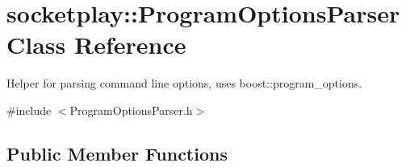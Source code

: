 \hypertarget{classsocketplay_1_1ProgramOptionsParser}{}\section{socketplay\+:\+:Program\+Options\+Parser Class Reference}
\label{classsocketplay_1_1ProgramOptionsParser}


Helper for parsing command line options, uses boost\+::program\+\_\+options.  




{\ttfamily \#include $<$Program\+Options\+Parser.\+h$>$}

\subsection*{Public Member Functions}
